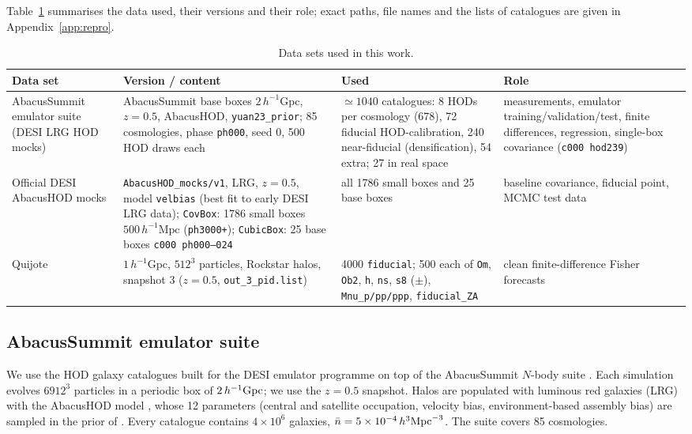 \documentclass[11pt,twocolumn]{article}
\newcommand{\Mpch}{\,h^{-1}\mathrm{Mpc}}
\begin{document}
Table~\ref{tab:datasets} summarises the data used, their versions and their role; exact paths, file names and the lists of catalogues are given in Appendix~\ref{app:repro}.

\begin{table}[!tp]
\centering\small
\begin{tabular}{p{3.3cm}p{4.6cm}p{4.3cm}p{4.3cm}}
\toprule
Data set & Version / content & Used & Role \\
\midrule
AbacusSummit emulator suite (DESI LRG HOD mocks) & AbacusSummit base boxes $2\,h^{-1}$Gpc, $z=0.5$, AbacusHOD, \texttt{yuan23\_prior}; 85 cosmologies, phase \texttt{ph000}, seed 0, 500 HOD draws each & $\simeq1040$ catalogues: 8 HODs per cosmology (678), 72 fiducial HOD-calibration, 240 near-fiducial (densification), 54 extra; 27 in real space & measurements, emulator training/validation/test, finite differences, regression, single-box covariance (\texttt{c000 hod239}) \\
Official DESI AbacusHOD mocks & \texttt{AbacusHOD\_mocks/v1}, LRG, $z=0.5$, model \texttt{velbias} (best fit to early DESI LRG data); \texttt{CovBox}: 1786 small boxes $500\Mpch$ (\texttt{ph3000+}); \texttt{CubicBox}: 25 base boxes \texttt{c000 ph000--024} & all 1786 small boxes and 25 base boxes & baseline covariance, fiducial point, MCMC test data \\
Quijote & $1\,h^{-1}$Gpc, $512^3$ particles, Rockstar halos, snapshot 3 ($z=0.5$, \texttt{out\_3\_pid.list}) & 4000 \texttt{fiducial}; 500 each of \texttt{Om}, \texttt{Ob2}, \texttt{h}, \texttt{ns}, \texttt{s8} ($\pm$), \texttt{Mnu\_p/pp/ppp}, \texttt{fiducial\_ZA} & clean finite-difference Fisher forecasts \\
\bottomrule
\end{tabular}
\caption{Data sets used in this work.}
\label{tab:datasets}
\end{table}

\subsection{AbacusSummit emulator suite}

We use the HOD galaxy catalogues built for the DESI emulator programme on top of the AbacusSummit $N$-body suite \cite{Maksimova2021}. Each simulation evolves $6912^3$ particles in a periodic box of $2\,h^{-1}{\rm Gpc}$; we use the $z=0.5$ snapshot. Halos are populated with luminous red galaxies (LRG) with the AbacusHOD model \cite{Yuan2022}, whose 12 parameters (central and satellite occupation, velocity bias, environment-based assembly bias) are sampled in the prior of \cite{Yuan2023}. Every catalogue contains $4\times10^6$ galaxies, $\bar n = 5\times10^{-4}\,h^3{\rm Mpc}^{-3}$. The suite covers 85 cosmologies.
\end{document}
